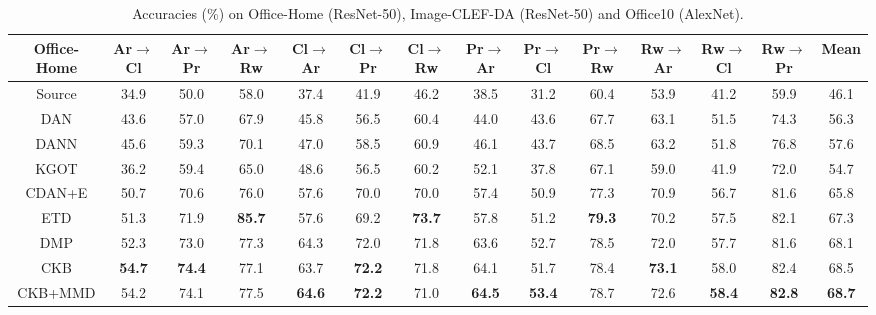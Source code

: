\documentclass[final]{cvpr}
\begin{document}
\begin{table*}[t]
\setlength{\abovecaptionskip}{0.cm}
\setlength{\belowcaptionskip}{-0.01cm}
\caption{Accuracies (\%) on Office-Home (ResNet-50), Image-CLEF-DA (ResNet-50) and Office10 (AlexNet).}
\label{tab:Office-Home&CLEF&10}
\centering
\renewcommand{\tabcolsep}{0.02pc}
\begin{tabular}{c|cccccccccccc|c}
\toprule[1pt]
\textbf{Office-Home} & Ar$\to$Cl & Ar$\to$Pr & Ar$\to$Rw & Cl$\to$Ar & Cl$\to$Pr & Cl$\to$Rw &
Pr$\to$Ar & Pr$\to$Cl & Pr$\to$Rw & Rw$\to$Ar & Rw$\to$Cl & Rw$\to$Pr & Mean \\
\hline
Source \cite{he2016deep} & 34.9 & 50.0 & 58.0 & 37.4 & 41.9 & 46.2 & 38.5 & 31.2 & 60.4 & 53.9 & 41.2 & 59.9 & 46.1 \\
DAN \cite{long2015learning} & 43.6 & 57.0 & 67.9 & 45.8 & 56.5 & 60.4 & 44.0 & 43.6 & 67.7 & 63.1 & 51.5 & 74.3 & 56.3 \\				
DANN \cite{ganin2016domain} & 45.6 & 59.3 & 70.1 & 47.0 & 58.5 & 60.9 & 46.1 & 43.7 & 68.5 & 63.2 & 51.8 & 76.8 & 57.6 \\
KGOT \cite{zhang2019optimal} & 36.2 & 59.4 & 65.0 & 48.6 & 56.5 & 60.2 & 52.1 & 37.8 & 67.1 & 59.0 & 41.9 & 72.0 & 54.7 \\
CDAN+E \cite{long2018conditional} & 50.7 & 70.6 & 76.0 & 57.6 & 70.0 & 70.0 & 57.4 & 50.9 & 77.3 & 70.9 & 56.7 & 81.6 & 65.8 \\
ETD \cite{li2020Enhanced} & 51.3 & 71.9 & \textbf{85.7} & 57.6 & 69.2 & \textbf{73.7} &  57.8 & 51.2 & \textbf{79.3} & 70.2 & 57.5 & 82.1 & 67.3\\
DMP \cite{luo2020unsupervised} & 52.3 & 73.0 & 77.3 & 64.3 & 72.0 & 71.8 & 63.6 & 52.7 & 78.5 & 72.0 & 57.7 & 81.6 & 68.1 \\
\hline
CKB & \textbf{54.7} & \textbf{74.4} & 77.1 & 63.7 & \textbf{72.2} & 71.8 & 64.1 & 51.7 & 78.4 & \textbf{73.1} & 58.0 & 82.4 & 68.5 \\
CKB+MMD & 54.2 & 74.1 & 77.5 & \textbf{64.6} & \textbf{72.2} & 71.0 & \textbf{64.5} & \textbf{53.4} & 78.7 & 72.6 & \textbf{58.4} & \textbf{82.8} & \textbf{68.7} \\
\bottomrule[1pt]
\end{tabular}

\end{table*}
\end{document}
